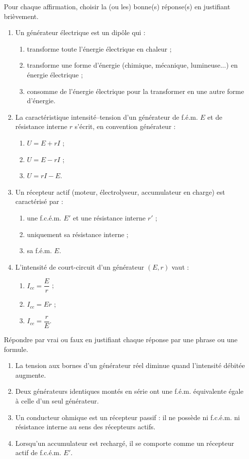 \documentclass[11pt]{article}
\begin{document}
\begin{exercice}
Pour chaque affirmation, choisir la (ou les) bonne(s) réponse(s) en justifiant brièvement.
\begin{enumerate}
\item Un générateur électrique est un dipôle qui :
\begin{enumerate}
\item transforme toute l'énergie électrique en chaleur ;
\item transforme une forme d'énergie (chimique, mécanique, lumineuse...) en énergie électrique ;
\item consomme de l'énergie électrique pour la transformer en une autre forme d'énergie.
\end{enumerate}
\item La caractéristique intensité--tension d'un générateur de f.é.m. $E$ et de résistance interne $r$ s'écrit, en convention générateur :
\begin{enumerate}
\item $U = E + rI$ ; \item $U = E - rI$ ; \item $U = rI - E$.
\end{enumerate}
\item Un récepteur actif (moteur, électrolyseur, accumulateur en charge) est caractérisé par :
\begin{enumerate}
\item une f.c.é.m. $E'$ et une résistance interne $r'$ ;
\item uniquement sa résistance interne ;
\item sa f.é.m. $E$.
\end{enumerate}
\item L'intensité de court-circuit d'un générateur $(E, r)$ vaut :
\begin{enumerate}
\item $I_{cc} = \dfrac{E}{r}$ ; \item $I_{cc} = Er$ ; \item $I_{cc} = \dfrac{r}{E}$.
\end{enumerate}
\end{enumerate}
\end{exercice}

\begin{exercice}
Répondre par vrai ou faux en justifiant chaque réponse par une phrase ou une formule.
\begin{enumerate}
\item La tension aux bornes d'un générateur réel diminue quand l'intensité débitée augmente.
\item Deux générateurs identiques montés en série ont une f.é.m. équivalente égale à celle d'un seul générateur.
\item Un conducteur ohmique est un récepteur passif : il ne possède ni f.c.é.m. ni résistance interne au sens des récepteurs actifs.
\item Lorsqu'un accumulateur est rechargé, il se comporte comme un récepteur actif de f.c.é.m. $E'$.
\end{enumerate}
\end{exercice}
\end{document}
